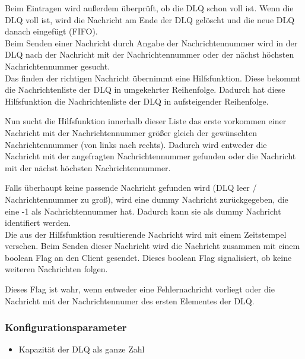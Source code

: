 \documentclass{article}
\begin{document}
Beim Eintragen wird außerdem überprüft, ob die DLQ schon voll ist. Wenn die DLQ voll ist, wird die Nachricht am Ende der
DLQ gelöscht und die neue DLQ danach eingefügt (FIFO).\\

Beim Senden einer Nachricht durch Angabe der Nachrichtennummer wird in der DLQ nach der Nachricht mit der
Nachrichtennummer oder der nächst höchsten Nachrichtennummer gesucht.\\

Das finden der richtigen Nachricht übernimmt eine Hilfsfunktion. Diese bekommt die Nachrichtenliste der DLQ in
umgekehrter Reihenfolge. Dadurch hat diese Hilfsfunktion die Nachrichtenliste der DLQ in aufsteigender Reihenfolge.

Nun sucht die Hilfsfunktion innerhalb dieser Liste das erste vorkommen einer Nachricht mit der Nachrichtennummer größer
gleich der gewünschten Nachrichtennummer (von links nach rechts). Dadurch wird entweder die Nachricht mit der angefragten Nachrichtennummer
gefunden oder die Nachricht mit der nächst höchsten Nachrichtennummer.

Falls überhaupt keine passende Nachricht gefunden wird (DLQ leer / Nachrichtennummer zu groß), wird eine dummy Nachricht
zurückgegeben, die eine -1 als Nachrichtennummer hat. Dadurch kann sie als dummy Nachricht identifiert werden.\\

Die aus der Hilfsfunktion resultierende Nachricht wird mit einem Zeitstempel versehen. Beim Senden dieser Nachricht wird
die Nachricht zusammen mit einem boolean Flag an den Client gesendet. Dieses boolean Flag signalisiert, ob keine
weiteren Nachrichten folgen.

Dieses Flag ist wahr, wenn entweder eine Fehlernachricht vorliegt oder die Nachricht mit der Nachrichtennumer des ersten
Elementes der DLQ.

\subsubsection{Konfigurationsparameter}
\begin{itemize}
    \item Kapazität der DLQ als ganze Zahl
\end{itemize}
\end{document}
